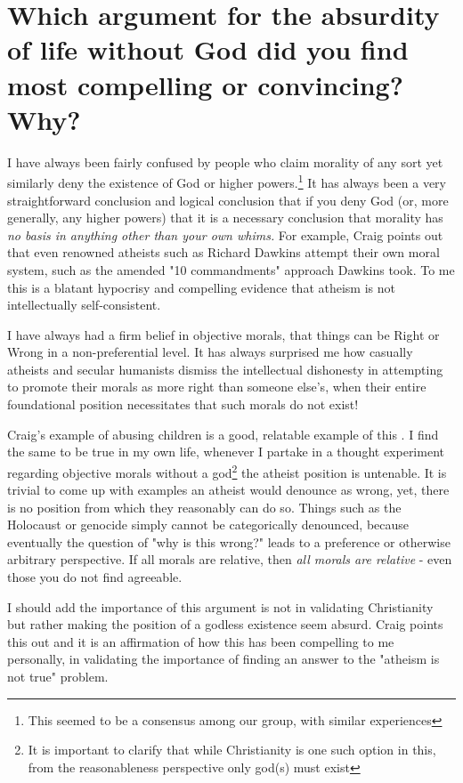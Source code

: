 \documentclass[12pt]{turabian-researchpaper}
\begin{document}
\section{Which argument for the absurdity of life without God did you find most compelling or convincing? Why?}
I have always been fairly confused by people who claim morality of any sort yet similarly deny the existence of God or higher powers.\footnote{This seemed to be a consensus among our group, with similar experiences}  It has always been a very straightforward conclusion and logical conclusion that if you deny God (or, more generally, any higher powers) that it is a necessary conclusion that morality has \textit{no basis in anything other than your own whims.} For example, Craig points out that even renowned atheists such as Richard Dawkins attempt their own moral system, such as the amended "10 commandments"\autocite[pg.81]{craig2008reasonable} approach Dawkins took. To me this is a blatant hypocrisy and compelling evidence that atheism is not intellectually self-consistent.

I have always had a firm belief in objective morals, that things can be Right or Wrong in a non-preferential level. It has always surprised me how casually atheists and secular humanists dismiss the intellectual dishonesty in attempting to promote their morals as more right than someone else's, when their entire foundational position necessitates that such morals do not exist!

Craig's example of abusing children is a good, relatable example of this \autocite[pg. 87-88]{craig2008reasonable}. I find the same to be true in my own life, whenever I partake in a thought experiment regarding objective morals without a god\footnote{It is important to clarify that while Christianity is one such option in this, from the reasonableness perspective only god(s) must exist} the atheist position is untenable. It is trivial to come up with examples an atheist would denounce as wrong, yet, there is no position from which they reasonably can do so. Things such as the Holocaust or genocide simply cannot be categorically denounced, because eventually the question of "why is this wrong?" leads to a preference or otherwise arbitrary perspective. If all morals are relative, then \textit{all morals are relative} - even those you do not find agreeable.

I should add the importance of this argument is not in validating Christianity but rather making the position of a godless existence seem absurd. Craig points this out and it is an affirmation of how this has been compelling to me personally, in validating the importance of finding an answer to the "atheism is not true" problem.
\end{document}
